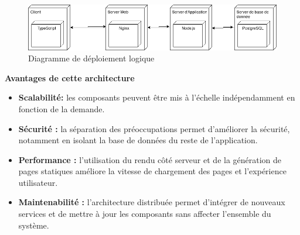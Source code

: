 \begin{figure}[H]
  \centering
  \includegraphics[width=1\textwidth]{figure/deployemnt.drawio(1).png}
  \caption{Diagramme de déploiement logique}
\end{figure}

\textbf{Avantages de cette architecture }

\begin{itemize}
  \item \textbf{Scalabilité:} les composants peuvent être mis à l’échelle
    indépendamment en fonction de la demande.

  \item \textbf{Sécurité :} la séparation des préoccupations permet
    d’améliorer la sécurité, notamment en isolant la base de données
    du reste de l’application.

  \item \textbf{Performance :} l'utilisation du rendu côté serveur et de la
    génération de pages statiques améliore la vitesse de chargement des
    pages et l’expérience utilisateur.

  \item \textbf{Maintenabilité :} l’architecture distribuée permet d’intégrer
    de nouveaux services et de mettre à jour les composants sans affecter
    l’ensemble du système.

\end{itemize}
